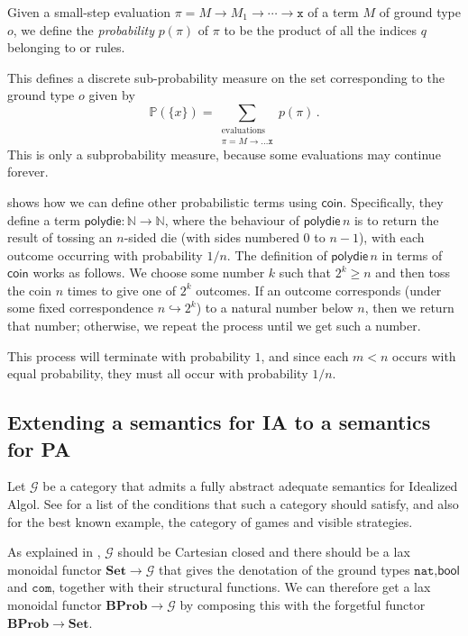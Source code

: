 \documentclass{svproc}
\newcommand\G{\mathcal{G}}
\newcommand{\nat}{{\mathtt{nat}}}
\newcommand*\from{\colon}
\newcommand{\x}{{\mathtt{x}}}
\newcommand{\0}{{\mathtt{0}}} \newcommand{\com}{{\mathtt{com}}}
\newcommand{\catname}[1]{\mathbf{#1}}
\newcommand{\Set}{\catname{Set}}
\newcommand{\BProb}{\catname{BProb}}
\newcommand{\bN}{\mathbb{N}}
\newcommand{\bP}{\mathbb{P}}
\newcommand{\coin}{\textsf{coin}}
\newcommand{\polydie}{\textsf{polydie}}
\newcommand{\bool}{\textsf{bool}}
\begin{document}
Given a small-step evaluation $\pi = M \to M_1 \to \cdots \to \x$ of a term $M$ of ground type $o$, we define the \emph{probability} $p(\pi)$ of $\pi$ to be the product of all the indices $q$ belonging to  or  rules.

This defines a discrete sub-probability measure on the set corresponding to the ground type $o$ given by
\[
  \bP(\{x\}) = \sum_{\substack{\text{evaluations}\\\pi = M \to\dots \x}}p(\pi)\,.
  \]
This is only a subprobability measure, because some evaluations may continue forever.

\cite{DanosHarmer} shows how we can define other probabilistic terms using $\coin$.  
Specifically, they define a term $\polydie\from\bN\to\bN$, where the behaviour of $\polydie\,n$ is to return the result of tossing an $n$-sided die (with sides numbered $0$ to $n-1$), with each outcome occurring with probability $1/n$.  
The definition of $\polydie\,n$ in terms of $\coin$ works as follows.  
We choose some number $k$ such that $2^k\ge n$ and then toss the coin $n$ times to give one of $2^k$ outcomes.  
If an outcome corresponds (under some fixed correspondence $n\hookrightarrow 2^k$) to a natural number below $n$, then we return that number; otherwise, we repeat the process until we get such a number.  

This process will terminate with probability $1$, and since each $m<n$ occurs with equal probability, they must all occur with probability $1/n$.

\subsection{Extending a semantics for IA to a semantics for PA}

Let $\G$ be a category that admits a fully abstract adequate semantics for Idealized Algol.  
See \cite{SamsonGuyIAPassive} for a list of the conditions that such a category should satisfy, and also for the best known example, the category of games and visible strategies.

As explained in \cite{SamsonGuyIAPassive}, $\G$ should be Cartesian closed and there should be a lax monoidal functor $\Set\to \G$ that gives the denotation of the ground types $\nat$,$\bool$ and $\com$, together with their structural functions.
We can therefore get a lax monoidal functor $\BProb \to \G$ by composing this with the forgetful functor $\BProb\to\Set$.
\end{document}
